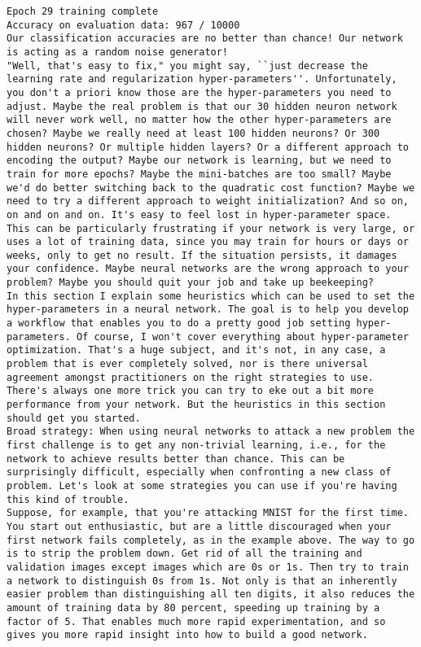 \begin{lstlisting}
Epoch 29 training complete
Accuracy on evaluation data: 967 / 10000
Our classification accuracies are no better than chance! Our network is acting as a random noise generator!
"Well, that's easy to fix," you might say, ``just decrease the learning rate and regularization hyper-parameters''. Unfortunately, you don't a priori know those are the hyper-parameters you need to adjust. Maybe the real problem is that our 30 hidden neuron network will never work well, no matter how the other hyper-parameters are chosen? Maybe we really need at least 100 hidden neurons? Or 300 hidden neurons? Or multiple hidden layers? Or a different approach to encoding the output? Maybe our network is learning, but we need to train for more epochs? Maybe the mini-batches are too small? Maybe we'd do better switching back to the quadratic cost function? Maybe we need to try a different approach to weight initialization? And so on, on and on and on. It's easy to feel lost in hyper-parameter space. This can be particularly frustrating if your network is very large, or uses a lot of training data, since you may train for hours or days or weeks, only to get no result. If the situation persists, it damages your confidence. Maybe neural networks are the wrong approach to your problem? Maybe you should quit your job and take up beekeeping?
In this section I explain some heuristics which can be used to set the hyper-parameters in a neural network. The goal is to help you develop a workflow that enables you to do a pretty good job setting hyper-parameters. Of course, I won't cover everything about hyper-parameter optimization. That's a huge subject, and it's not, in any case, a problem that is ever completely solved, nor is there universal agreement amongst practitioners on the right strategies to use. There's always one more trick you can try to eke out a bit more performance from your network. But the heuristics in this section should get you started.
Broad strategy: When using neural networks to attack a new problem the first challenge is to get any non-trivial learning, i.e., for the network to achieve results better than chance. This can be surprisingly difficult, especially when confronting a new class of problem. Let's look at some strategies you can use if you're having this kind of trouble.
Suppose, for example, that you're attacking MNIST for the first time. You start out enthusiastic, but are a little discouraged when your first network fails completely, as in the example above. The way to go is to strip the problem down. Get rid of all the training and validation images except images which are 0s or 1s. Then try to train a network to distinguish 0s from 1s. Not only is that an inherently easier problem than distinguishing all ten digits, it also reduces the amount of training data by 80 percent, speeding up training by a factor of 5. That enables much more rapid experimentation, and so gives you more rapid insight into how to build a good network.

\end{lstlisting}
